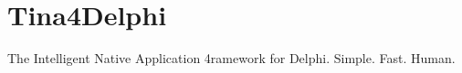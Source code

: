 \chapter{Tina4\+Delphi}
\hypertarget{md_readme}{}\label{md_readme}
\label{md_readme_autotoc_md0}%
%
 The Intelligent Native Application 4ramework for Delphi. Simple. Fast. Human. 